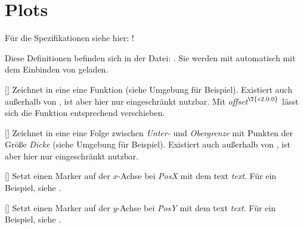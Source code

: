 \section{Plots \tiny{}}
\begin{center}
    Für die Spezifikationen siehe hier: !
\end{center}
Diese Definitionen befinden sich in der Datei: . Sie werden mit  automatisch mit dem Einbinden von  geladen.

%
%
%

[]
Zeichnet in eine  eine Funktion (siehe Umgebung für Beispiel). Existiert auch außerhalb von , ist aber hier nur eingeschränkt nutzbar. Mit \emph{offset}${}^{\T{v2.0.0}}$ lässt sich die Funktion entsprechend verschieben.

%
%
%

[\secline{}]
Zeichnet in eine  eine Folge zwischen \emph{Unter-} und \emph{Obergrenze} mit Punkten der Größe \emph{Dicke} (siehe Umgebung für Beispiel). Existiert auch außerhalb von , ist aber hier nur eingeschränkt nutzbar.

%
%
%

[]
Setzt einen Marker auf der $x$-Achse bei \emph{PosX} mit dem text \emph{text}. Für ein Beispiel, siehe .

%
%
%

[]
Setzt einen Marker auf der $y$-Achse bei \emph{PosY} mit dem text \emph{text}. Für ein Beispiel, siehe .

%
%
%
%
%
%

